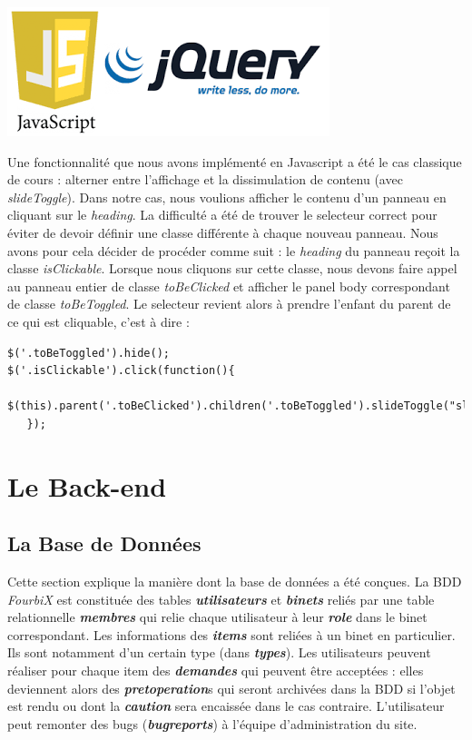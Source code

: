 \documentclass[titlepage,11pt,a4paper]{article}
\begin{document}
\begin{center}
\includegraphics[scale=0.25]{js-jquery.png}
\end{center}

Une fonctionnalité que nous avons implémenté en Javascript a été le cas classique de cours : alterner entre l'affichage et la dissimulation de contenu (avec \emph{slideToggle}). Dans notre cas, nous voulions afficher le contenu d'un panneau en cliquant sur le \emph{heading}. La difficulté a été de trouver le selecteur correct pour éviter de devoir définir une classe différente à chaque nouveau panneau. Nous avons pour cela décider de procéder comme suit : le \emph{heading} du panneau reçoit la classe \emph{isClickable}. Lorsque nous cliquons sur cette classe, nous devons faire appel au panneau entier de classe \emph{toBeClicked} et afficher le panel body correspondant de classe \emph{toBeToggled}. Le selecteur revient alors à prendre l'enfant du parent de ce qui est cliquable, c'est à dire : 

\begin{lstlisting}[title=Affichage des éléments dans un panneau]
$('.toBeToggled').hide();
$('.isClickable').click(function(){
   $(this).parent('.toBeClicked').children('.toBeToggled').slideToggle("slow");
   });
\end{lstlisting}


\section{Le Back-end}

\subsection{La Base de Données}

Cette section explique la manière dont la base de données a été conçues. La BDD \emph{FourbiX} est constituée des tables \textbf{\emph{utilisateurs}} et \textbf{\emph{binets}} reliés par une table relationnelle \textbf{\emph{membres}} qui relie chaque utilisateur à leur \textbf{\emph{role}} dans le binet correspondant. Les informations des \textbf{\emph{items}} sont reliées à un binet en particulier. Ils sont notamment d'un certain type (dans \textbf{\emph{types}}). Les utilisateurs peuvent réaliser pour chaque item des \textbf{\emph{demandes}} qui peuvent être acceptées : elles deviennent alors des \textbf{\emph{pretoperation}}s qui seront archivées dans la BDD si l'objet est rendu ou dont la \textbf{\emph{caution}} sera encaissée dans le cas contraire. L'utilisateur peut remonter des bugs (\textbf{\emph{bugreports}}) à l'équipe d'administration du site.\\
\end{document}

